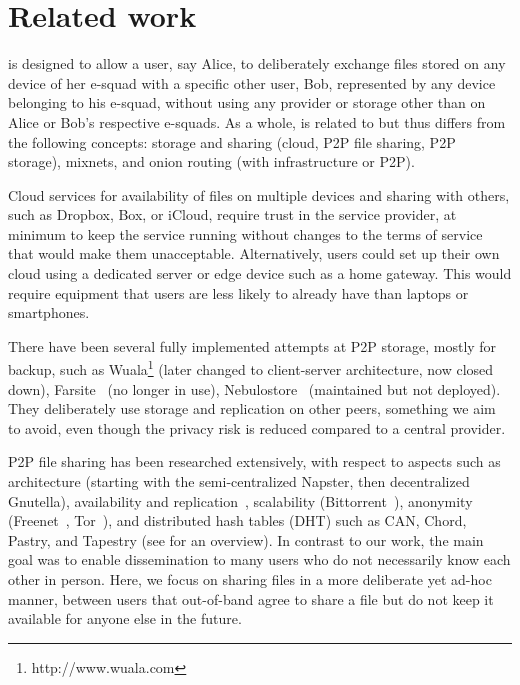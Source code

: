 \section{Related work}%
\label{RelatedWork}

\name is designed to allow a user, say Alice,  to deliberately exchange files stored on any device of her e-squad with a specific other user, Bob, represented by any device belonging to his e-squad, without using any provider or storage other than on Alice or Bob's respective e-squads. As a whole, \name is related to but thus differs from the following concepts: storage and sharing (cloud, P2P file sharing, P2P storage),  mixnets, and onion routing (with infrastructure or P2P).  

Cloud services for availability of files on multiple devices and sharing with others, such as Dropbox, Box, or iCloud, require trust in the service provider, at minimum to keep the service running without changes to the terms of service that would make them unacceptable. Alternatively, users could set up their own cloud using a dedicated server or edge device such as a home gateway. This would require equipment that users are less likely to already have than laptops or smartphones. 

There have been several fully implemented attempts at P2P storage, mostly for backup, such as Wuala\footnote{http://www.wuala.com} (later changed to client-server architecture, now closed down), Farsite~\cite{farsite} (no longer in use), Nebulostore~\cite{nebulo} (maintained but not deployed). They deliberately use storage and replication on other peers, something we aim to avoid, even though the privacy risk is reduced compared to a central provider. 

P2P file sharing has been researched extensively, with respect to aspects such as architecture (starting with the semi-centralized Napster, then decentralized Gnutella), availability and replication~\cite{replica}, scalability (Bittorrent~\cite{bittorrent-incentives}), anonymity (Freenet~\cite{Clarke:2001}, Tor~\cite{Tor}), and distributed hash tables (DHT) such as CAN, Chord, Pastry, and Tapestry (see \cite{dhtchurn} for an overview). In contrast to our work, the main goal was to enable dissemination to many users who do not necessarily know each other in person. Here, we focus on sharing files in a more deliberate yet ad-hoc manner, \ie between users that out-of-band agree to share a file but do not keep it available for anyone else in the future. 

